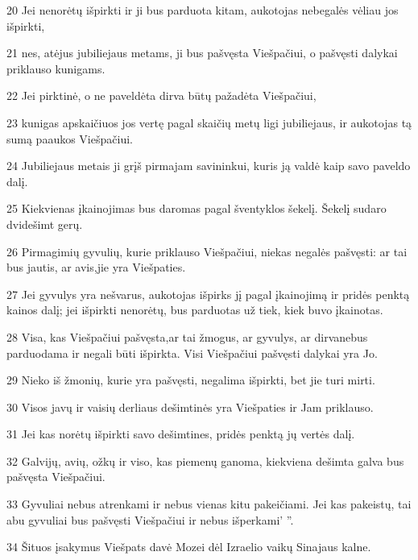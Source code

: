\par 20 Jei nenorėtų išpirkti ir ji bus parduota kitam, aukotojas nebegalės vėliau jos išpirkti, 
\par 21 nes, atėjus jubiliejaus metams, ji bus pašvęsta Viešpačiui, o pašvęsti dalykai priklauso kunigams. 
\par 22 Jei pirktinė, o ne paveldėta dirva būtų pažadėta Viešpačiui, 
\par 23 kunigas apskaičiuos jos vertę pagal skaičių metų ligi jubiliejaus, ir aukotojas tą sumą paaukos Viešpačiui. 
\par 24 Jubiliejaus metais ji grįš pirmajam savininkui, kuris ją valdė kaip savo paveldo dalį. 
\par 25 Kiekvienas įkainojimas bus daromas pagal šventyklos šekelį. Šekelį sudaro dvidešimt gerų. 
\par 26 Pirmagimių gyvulių, kurie priklauso Viešpačiui, niekas negalės pašvęsti: ar tai bus jautis, ar avis,­jie yra Viešpaties. 
\par 27 Jei gyvulys yra nešvarus, aukotojas išpirks jį pagal įkainojimą ir pridės penktą kainos dalį; jei išpirkti nenorėtų, bus parduotas už tiek, kiek buvo įkainotas. 
\par 28 Visa, kas Viešpačiui pašvęsta,­ar tai žmogus, ar gyvulys, ar dirva­nebus parduodama ir negali būti išpirkta. Visi Viešpačiui pašvęsti dalykai yra Jo. 
\par 29 Nieko iš žmonių, kurie yra pašvęsti, negalima išpirkti, bet jie turi mirti. 
\par 30 Visos javų ir vaisių derliaus dešimtinės yra Viešpaties ir Jam priklauso. 
\par 31 Jei kas norėtų išpirkti savo dešimtines, pridės penktą jų vertės dalį. 
\par 32 Galvijų, avių, ožkų ir viso, kas piemenų ganoma, kiekviena dešimta galva bus pašvęsta Viešpačiui. 
\par 33 Gyvuliai nebus atrenkami ir nebus vienas kitu pakeičiami. Jei kas pakeistų, tai abu gyvuliai bus pašvęsti Viešpačiui ir nebus išperkami’ ”. 
\par 34 Šituos įsakymus Viešpats davė Mozei dėl Izraelio vaikų Sinajaus kalne.



